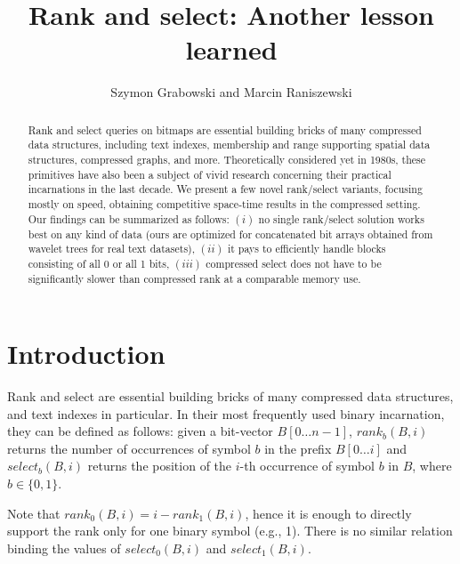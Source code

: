 \documentclass{llncs}
\begin{document}
\title{Rank and select: Another lesson learned}


\author{Szymon Grabowski
and
Marcin Raniszewski
}


\maketitle

\begin{abstract}
Rank and select queries on bitmaps are essential building bricks of 
many compressed data structures, including 
text indexes, membership and range supporting spatial data structures, 
compressed graphs, and more.
Theoretically considered yet in 1980s, these primitives have also been 
a subject of vivid research concerning their practical incarnations 
in the last decade.
We present a few novel rank/select variants, focusing mostly on speed, 
obtaining competitive space-time results in the compressed setting.
Our findings can be summarized as follows: $(i)$ no single rank/select solution 
works best on any kind of data (ours are optimized for 
concatenated bit arrays obtained from wavelet trees for real text datasets), 
$(ii)$ it pays to 
efficiently 
handle blocks consisting of all 0 or all 1 bits,
$(iii)$ compressed select does not have to be significantly slower than 
compressed rank at a comparable memory use.
\end{abstract}

\section{Introduction}
\noindent 
Rank and select are essential building bricks of many compressed 
data structures, and text indexes in particular.
In their most frequently used binary incarnation, they can be defined 
as follows:
given a bit-vector $B[0 \ldots n-1]$, 
$rank_b(B, i)$ returns the number of occurrences of symbol $b$ 
in the prefix $B[0 \ldots i]$ 
and $select_b(B, i)$ returns the position of the $i$-th occurrence 
of symbol $b$ in $B$, where $b \in \{0, 1\}$.

Note that $rank_0(B, i) = i - rank_1(B, i)$, hence it is enough 
to directly support the rank only for one binary symbol (e.g., 1).
There is no similar relation binding the values of $select_0(B, i)$ 
and $select_1(B, i)$.
\end{document}
